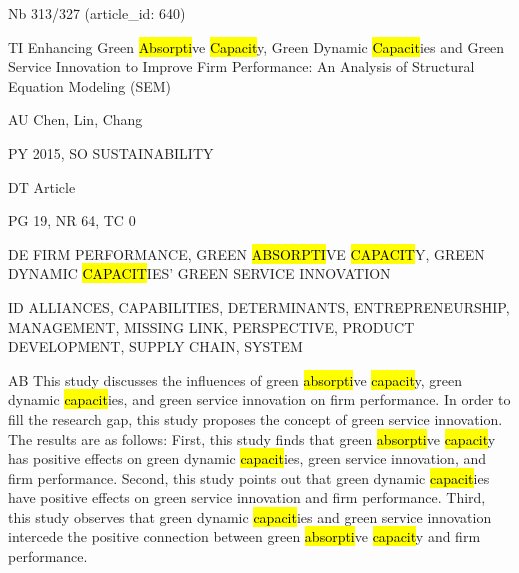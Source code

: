 \documentclass[a4paper]{article}
\begin{document}
\vspace*{-2cm}
Nb \tabto{0cm}313/327 (article\_id: 640)\par
TI \tabto{0cm}Enhancing Green \hl{Absorpti}ve \hl{Capacit}y, Green Dynamic \hl{Capacit}ies and Green Service Innovation to Improve Firm Performance: An Analysis of Structural Equation Modeling (SEM)\par
AU \tabto{0cm}Chen, Lin, Chang\par
PY \tabto{0cm}2015, SO SUSTAINABILITY\par
DT \tabto{0cm}Article\par
PG \tabto{0cm}19, NR 64, TC 0\par
DE \tabto{0cm}FIRM PERFORMANCE, GREEN \hl{ABSORPTI}VE \hl{CAPACIT}Y, GREEN DYNAMIC \hl{CAPACIT}IES' GREEN SERVICE INNOVATION\par
ID \tabto{0cm}ALLIANCES, CAPABILITIES, DETERMINANTS, ENTREPRENEURSHIP, MANAGEMENT, MISSING LINK, PERSPECTIVE, PRODUCT DEVELOPMENT, SUPPLY CHAIN, SYSTEM\par
AB \tabto{0cm}This study discusses the influences of green \hl{absorpti}ve \hl{capacit}y, green dynamic \hl{capacit}ies, and green service innovation on firm performance. In order to fill the research gap, this study proposes the concept of green service innovation. The results are as follows: First, this study finds that green \hl{absorpti}ve \hl{capacit}y has positive effects on green dynamic \hl{capacit}ies, green service innovation, and firm performance. Second, this study points out that green dynamic \hl{capacit}ies have positive effects on green service innovation and firm performance. Third, this study observes that green dynamic \hl{capacit}ies and green service innovation intercede the positive connection between green \hl{absorpti}ve \hl{capacit}y and firm performance.\par
\clearpage
\end{document}
